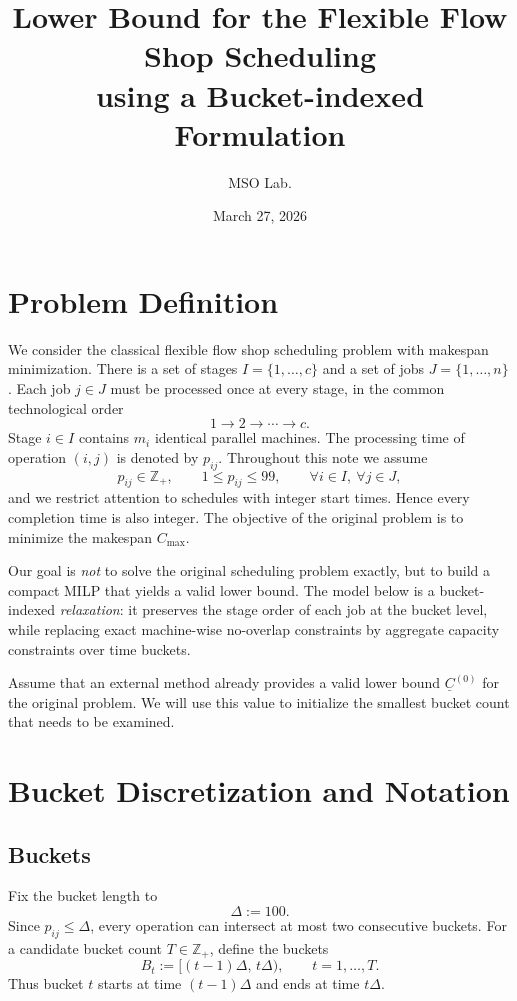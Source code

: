 \documentclass[11pt]{article}
\author{MSO Lab.}
\title{Lower Bound for the Flexible Flow Shop Scheduling\\using a Bucket-indexed Formulation}
\date{March 27, 2026}
\begin{document}
\maketitle

\section{Problem Definition}

We consider the classical flexible flow shop scheduling problem with makespan minimization.
There is a set of stages $I=\{1,\dots,c\}$ and a set of jobs $J=\{1,\dots,n\}$.
Each job $j\in J$ must be processed once at every stage, in the common technological order
\[
1 \rightarrow 2 \rightarrow \cdots \rightarrow c.
\]
Stage $i\in I$ contains $m_i$ identical parallel machines.
The processing time of operation $(i,j)$ is denoted by $p_{ij}$.
Throughout this note we assume
\[
p_{ij}\in\mathbb Z_{+},
\qquad
1\le p_{ij}\le 99,
\qquad \forall i\in I,\ \forall j\in J,
\]
and we restrict attention to schedules with integer start times.
Hence every completion time is also integer.
The objective of the original problem is to minimize the makespan $C_{\max}$.

Our goal is \emph{not} to solve the original scheduling problem exactly, but to build a compact MILP that yields a valid lower bound.
The model below is a bucket-indexed \emph{relaxation}: it preserves the stage order of each job at the bucket level, while replacing exact machine-wise no-overlap constraints by aggregate capacity constraints over time buckets.

Assume that an external method already provides a valid lower bound $\underline C^{(0)}$ for the original problem.
We will use this value to initialize the smallest bucket count that needs to be examined.

\section{Bucket Discretization and Notation}

\subsection{Buckets}

Fix the bucket length to
\[
\Delta := 100.
\]
Since $p_{ij}\le \Delta$, every operation can intersect at most two consecutive buckets.
For a candidate bucket count $T\in\mathbb Z_{+}$, define the buckets
\[
B_t := [(t-1)\Delta,\, t\Delta),
\qquad t=1,\dots,T.
\]
Thus bucket $t$ starts at time $(t-1)\Delta$ and ends at time $t\Delta$.
\end{document}
